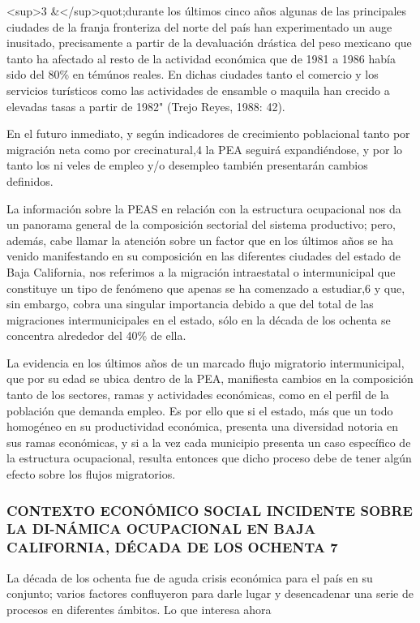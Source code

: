 \documentclass{article}
\begin{document}
<sup>3 \&</sup>quot;durante los últimos cinco años algunas de las principales ciudades de la franja fronteriza del norte del país han experimentado un auge inusitado, precisamente a partir de la devaluación drástica del peso mexicano que tanto ha afectado al resto de la actividad económica que de 1981 a 1986 había sido del 80\% en témúnos reales. En dichas ciudades tanto el comercio y los servicios turísticos como las actividades de ensamble o maquila han crecido a elevadas tasas a partir de 1982" (Trejo Reyes, 1988: 42).

En el futuro inmediato, y según indicadores de crecimiento poblacional tanto por migración neta como por creci\lliento natural,4 la PEA seguirá expandiéndose, y por lo tanto los ni veles de empleo y/o desempleo también presentarán cambios definidos.

La información sobre la PEAS en relación con la estructura ocupacional nos da un panorama general de la composición sectorial del sistema productivo; pero, además, cabe llamar la atención sobre un factor que en los últimos años se ha venido manifestando en su composición en las diferentes ciudades del estado de Baja California, nos referimos a la migración intraestatal o intermunicipal que constituye un tipo de fenómeno que apenas se ha comenzado a estudiar,6 y que, sin embargo, cobra una singular importancia debido a que del total de las migraciones intermunicipales en el estado, sólo en la década de los ochenta se concentra alrededor del 40\% de ella.

La evidencia en los últimos años de un marcado flujo migratorio intermunicipal, que por su edad se ubica dentro de la PEA, manifiesta cambios en la composición tanto de los sectores, ramas y actividades económicas, como en el perfil de la población que demanda empleo. Es por ello que si el estado, más que un todo homogéneo en su productividad económica, presenta una diversidad notoria en sus ramas económicas, y si a la vez cada municipio presenta un caso específico de la estructura ocupacional, resulta entonces que dicho proceso debe de tener algún efecto sobre los flujos migratorios.

\subsubsection{CONTEXTO ECONÓMICO SOCIAL INCIDENTE SOBRE LA DI-NÁMICA OCUPACIONAL EN BAJA CALIFORNIA, DÉCADA DE LOS OCHENTA 7}

La década de los ochenta fue de aguda crisis económica para el país en su conjunto; varios factores confluyeron para darle lugar y desencadenar una serie de procesos en diferentes ámbitos. Lo que interesa ahora
\end{document}
